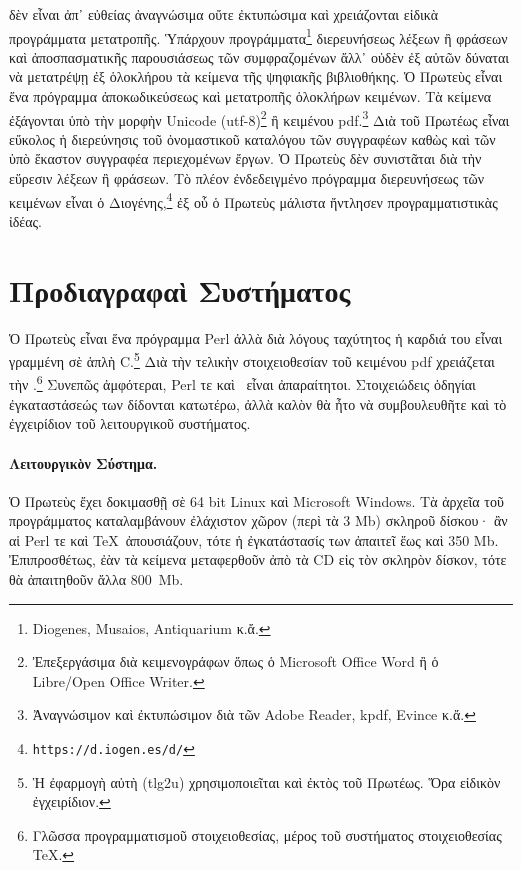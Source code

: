 \documentclass[12pt,a4paper]{article}
\begin{document}
  δὲν εἶναι ἀπ᾽ εὐθείας ἀναγνώσιμα οὔτε ἐκτυπώσιμα καὶ χρειάζονται
  εἰδικὰ προγράμματα μετατροπῆς. Ὑπάρχουν
  προγράμματα\footnote{Diogenes, Musaios, Antiquarium κ.ἄ.}
  διερευνήσεως λέξεων ἢ φράσεων καὶ
  ἀποσπασματικῆς παρουσιάσεως τῶν συμφραζομένων ἄλλ᾽ οὐδὲν ἐξ αὐτῶν δύναται
  νὰ μετατρέψῃ ἐξ ὁλοκλήρου τὰ κείμενα τῆς ψηφιακῆς βιβλιοθήκης.
  Ὁ Πρωτεὺς εἶναι ἕνα πρόγραμμα ἀποκωδικεύσεως καὶ μετατροπῆς ὁλοκλήρων
  κειμένων. Τὰ κείμενα ἐξάγονται ὑπὸ τὴν μορφὴν Unicode
  (utf-8)\footnote{Ἐπεξεργάσιμα διὰ κειμενογράφων ὅπως ὁ Microsoft
  Office Word ἢ ὁ Libre/Open Office Writer.} ἢ κειμένου pdf.\footnote{Ἀναγνώσιμον
  καὶ ἐκτυπώσιμον διὰ τῶν Adobe Reader, kpdf, Evince κ.ἄ.} Διὰ τοῦ Πρωτέως
  εἶναι εὔκολος ἡ διερεύνησις τοῦ ὀνομαστικοῦ καταλόγου τῶν συγγραφέων
  καθὼς καὶ τῶν ὑπὸ ἕκαστον συγγραφέα περιεχομένων ἔργων.
  Ὁ Πρωτεὺς δὲν συνιστᾶται διὰ τὴν εὕρεσιν λέξεων ἢ φράσεων. Τὸ πλέον
  ἐνδεδειγμένο πρόγραμμα διερευνήσεως τῶν κειμένων εἶναι ὁ
  Διογένης,\footnote{\tt https://d.iogen.es/d/}
  ἐξ οὗ ὁ Πρωτεὺς μάλιστα ἤντλησεν προγραμματιστικὰς ἰδέας.
\newpage
\section{Προδιαγραφαὶ Συστήματος}
  Ὁ Πρωτεὺς εἶναι ἕνα πρόγραμμα Perl
  ἀλλὰ διὰ λόγους ταχύτητος ἡ καρδιά του εἶναι γραμμένη
  σὲ ἁπλὴ C.\footnote{Ἡ ἐφαρμογὴ αὐτὴ (tlg2u) χρησιμοποιεῖται
              καὶ ἐκτὸς τοῦ Πρωτέως. Ὅρα εἰδικὸν ἐγχειρίδιον.}
  Διὰ τὴν τελικὴν στοιχειοθεσίαν τοῦ κειμένου pdf
  χρειάζεται τὴν \XeTeX.\footnote{Γλῶσσα προγραμματισμοῦ στοιχειοθεσίας,
                                    μέρος τοῦ συστήματος στοιχειοθεσίας
                                    \TeX.}
  Συνεπῶς ἀμφότεραι, Perl τε καὶ \XeTeX\, εἶναι ἀπαραίτητοι.
  Στοιχειώδεις ὁδηγίαι ἐγκαταστάσεώς των δίδονται
  κατωτέρω, ἀλλὰ καλὸν θὰ ἦτο νὰ συμβουλευθῆτε καὶ τὸ ἐγχειρίδιον τοῦ
  λειτουργικοῦ συστήματος.
  \paragraph{Λειτουργικὸν Σύστημα.}
    Ὁ Πρωτεὺς ἔχει δοκιμασθῇ σὲ 64 bit Linux καὶ\newline
    Microsoft Windows. Τὰ ἀρχεῖα τοῦ προγράμματος καταλαμβάνουν ἐλάχιστον χῶρον (περὶ τὰ 3 Mb)
    σκληροῦ δίσκου· ἂν αἱ Perl τε καὶ \TeX\ ἀπουσιάζουν, τότε ἡ ἐγκατάστασίς
    των ἀπαιτεῖ ἕως καὶ 350 Mb.  Ἐπιπροσθέτως, ἐὰν τὰ κείμενα μεταφερθοῦν
    ἀπὸ τὰ CD εἰς τὸν σκληρὸν δίσκον, τότε θὰ ἀπαιτηθοῦν ἄλλα
    800\nolinebreak\ Mb.
\end{document}
